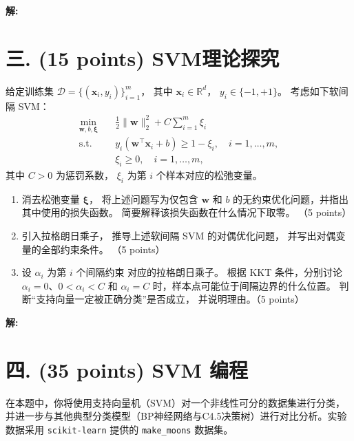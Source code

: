 \documentclass[8pt]{article}
\begin{document}
\textbf{\large 解:}

\newpage



\section*{三. (15 points) SVM理论探究}

给定训练集
$\mathcal{D}=\{(\boldsymbol{x}_i,y_i)\}_{i=1}^{m}$，
其中 $\boldsymbol{x}_i\in\mathbb{R}^{d}$，
$y_i\in\{-1,+1\}$。
考虑如下软间隔 SVM：
\[
\begin{aligned}
    \min_{\boldsymbol{w},b,\boldsymbol{\xi}}
    \quad &
    \frac{1}{2}\|\boldsymbol{w}\|_2^2
    +C\sum_{i=1}^{m}\xi_i \\
    \text{s.t.}\quad &
    y_i(\boldsymbol{w}^{\top}\boldsymbol{x}_i+b)
    \geq 1-\xi_i,\quad i=1,\ldots,m,\\
    & \xi_i\geq 0,\quad i=1,\ldots,m,
\end{aligned}
\]
其中 $C>0$ 为惩罚系数，
$\xi_i$ 为第 $i$ 个样本对应的松弛变量。

\begin{enumerate}
    \item 消去松弛变量 $\boldsymbol{\xi}$，
    将上述问题写为仅包含 $\boldsymbol{w}$ 和 $b$
    的无约束优化问题，并指出其中使用的损失函数。
    简要解释该损失函数在什么情况下取零。
    （5 points）

    \item 引入拉格朗日乘子，
    推导上述软间隔 SVM 的对偶优化问题，
    并写出对偶变量的全部约束条件。
    （5 points）

    \item 设 $\alpha_i$ 为第 $i$ 个间隔约束
    对应的拉格朗日乘子。
    根据 KKT 条件，分别讨论
    $\alpha_i=0$、$0<\alpha_i<C$ 和 $\alpha_i=C$
    时，样本点可能位于间隔边界的什么位置。
    判断“支持向量一定被正确分类”是否成立，
    并说明理由。（5 points）
\end{enumerate}

\textbf{\large 解:}

\newpage

\section*{四. (35 points) SVM 编程}

在本题中，你将使用支持向量机（SVM）对一个非线性可分的数据集进行分类，并进一步与其他典型分类模型（BP神经网络与C4.5决策树）进行对比分析。实验数据采用 \texttt{scikit-learn} 提供的 \texttt{make\_moons} 数据集。
\end{document}
